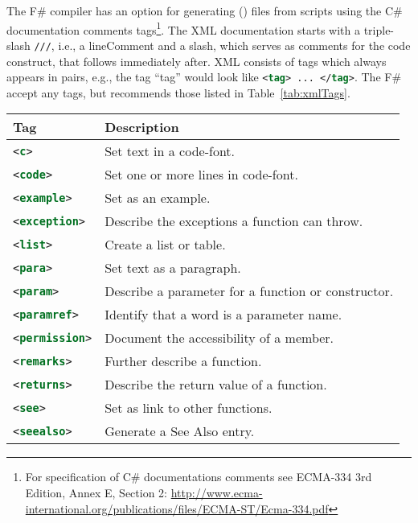 The F\# compiler has an option for generating  () files from scripts using the C\# documentation comments tags\footnote{For specification of C\# documentations comments see ECMA-334 3rd Edition, Annex E, Section 2: \url{http://www.ecma-international.org/publications/files/ECMA-ST/Ecma-334.pdf}}. The XML documentation starts with a triple-slash \lstinline{///}, i.e., a lineComment and a slash, which serves as comments for the code construct, that follows immediately after. XML consists of tags which always appears in pairs, e.g., the tag ``tag'' would look like \lstinline[language=xml]!<tag> ... </tag>!. The F\# accept any tags, but recommends those listed in Table~\ref{tab:xmlTags}.
\begin{table}
  \centering
  \begin{tabularx}{\linewidth}{|l|X|}
       \hline
    \rowcolor{headerRowColor} Tag & Description\\
    \hline
    \lstinline[language=xml]!<c>! &Set text in a code-font.\\
    \hline
    \lstinline[language=xml]!<code>! &Set one or more lines in code-font.\\
    \hline
    \lstinline[language=xml]!<example>! &Set as an example.\\
    \hline
    \lstinline[language=xml]!<exception>! &Describe the exceptions a function can throw.\\
    \hline
    \lstinline[language=xml]!<list>! &Create a list or table.\\
    \hline
    \lstinline[language=xml]!<para>! &Set text as a paragraph.\\
    \hline
    \lstinline[language=xml]!<param>! &Describe a parameter for a function or constructor.\\
    \hline
    \lstinline[language=xml]!<paramref>! &Identify that a word is a parameter name.\\
    \hline
    \lstinline[language=xml]!<permission>! &Document the accessibility of a member.\\
    \hline
    \lstinline[language=xml]!<remarks>! &Further describe a function.\\
    \hline
    \lstinline[language=xml]!<returns>! &Describe the return value of a function.\\
    \hline
    \lstinline[language=xml]!<see>! &Set as link to other functions.\\
    \hline
    \lstinline[language=xml]!<seealso>! &Generate a See Also entry.\\

\end{tabularx}
\end{table}
